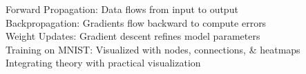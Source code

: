 \documentclass[preview]{standalone}
\begin{document}
Forward Propagation: Data flows from input to output\\Backpropagation: Gradients flow backward to compute errors\\Weight Updates: Gradient descent refines model parameters\\Training on MNIST: Visualized with nodes, connections, & heatmaps\\Integrating theory with practical visualization\\
\end{document}
